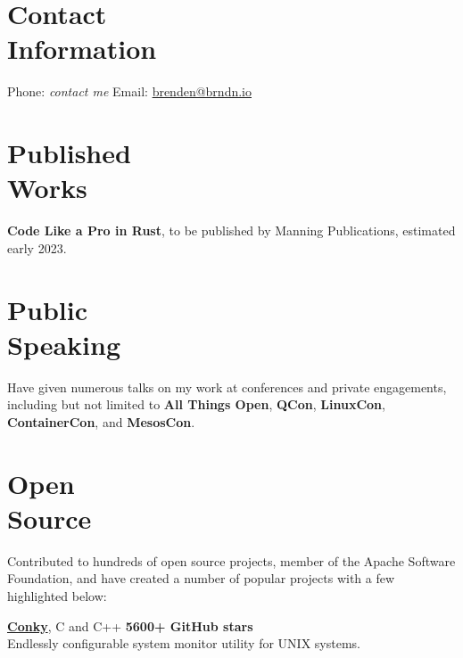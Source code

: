 \documentclass[margin,line]{resume}
\begin{document}
\begin{resume}

    \section{\mysidestyle Contact\\Information}

    Phone: \emph{contact me}                  \hfill
    Email: \href{mailto:brenden@brndn.io}{brenden@brndn.io}                   \hfill

    \vspace{3mm}

    \section{\mysidestyle Published\\Works}

    \textbf{Code Like a Pro in Rust}, to be published by Manning Publications,
    estimated early 2023.

    \vspace{3mm}

    \section{\mysidestyle Public\\Speaking}

    Have given numerous talks on my work at conferences and private engagements,
    including but not limited to \textbf{All Things Open}, \textbf{QCon},
    \textbf{LinuxCon}, \textbf{ContainerCon}, and \textbf{MesosCon}.
    
    \vspace{3mm}

    \section{\mysidestyle Open\\Source}

    Contributed to hundreds of open source projects, member of the Apache
    Software Foundation, and have created a number of popular projects with a
    few highlighted below:

    \href{https://github.com/brndnmtthws/conky}{\textbf{Conky}}, C and C++ \hfill \textbf{5600+ GitHub stars}\\
    Endlessly configurable system monitor utility for UNIX systems.


\end{resume}
\end{document}
